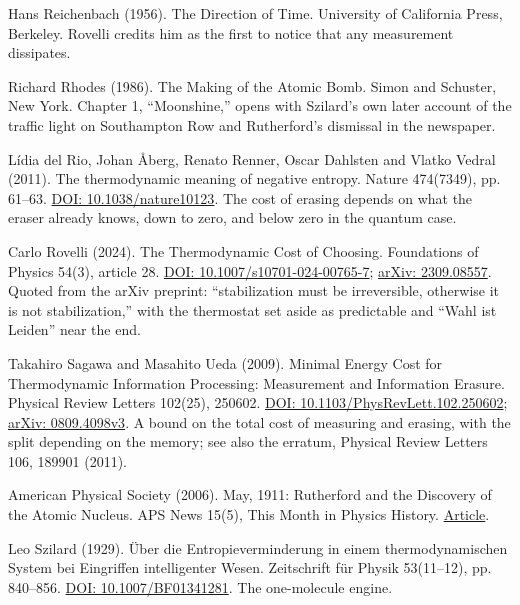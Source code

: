 \documentclass[11pt,twoside]{article}
\theoremstyle{thielethm}
\theoremstyle{thieledef}
\theoremstyle{thieledef}
\theoremstyle{thieledef}
\theoremstyle{thielethm}
\theoremstyle{thieleobs}
\theoremstyle{thielethm}
\begin{document}
\noindent Hans Reichenbach (1956). The Direction of Time. University of California Press, Berkeley. Rovelli credits him as the first to notice that any measurement dissipates.
\par\medskip

\noindent Richard Rhodes (1986). The Making of the Atomic Bomb. Simon and Schuster, New York. Chapter 1, ``Moonshine,'' opens with Szilard's own later account of the traffic light on Southampton Row and Rutherford's dismissal in the newspaper.
\par\medskip

\noindent L\'idia del Rio, Johan \AA{}berg, Renato Renner, Oscar Dahlsten and Vlatko Vedral (2011). The thermodynamic meaning of negative entropy. Nature 474(7349), pp. 61--63. \href{https://doi.org/10.1038/nature10123}{DOI: 10.1038/nature10123}. The cost of erasing depends on what the eraser already knows, down to zero, and below zero in the quantum case.
\par\medskip

\noindent Carlo Rovelli (2024). The Thermodynamic Cost of Choosing. Foundations of Physics 54(3), article 28. \href{https://doi.org/10.1007/s10701-024-00765-7}{DOI: 10.1007/s10701-024-00765-7}; \href{https://arxiv.org/abs/2309.08557}{arXiv: 2309.08557}. Quoted from the arXiv preprint: ``stabilization must be irreversible, otherwise it is not stabilization,'' with the thermostat set aside as predictable and ``Wahl ist Leiden'' near the end.
\par\medskip

\noindent Takahiro Sagawa and Masahito Ueda (2009). Minimal Energy Cost for Thermodynamic Information Processing: Measurement and Information Erasure. Physical Review Letters 102(25), 250602. \href{https://doi.org/10.1103/PhysRevLett.102.250602}{DOI: 10.1103/PhysRevLett.102.250602}; \href{https://arxiv.org/abs/0809.4098v3}{arXiv: 0809.4098v3}. A bound on the total cost of measuring and erasing, with the split depending on the memory; see also the erratum, Physical Review Letters 106, 189901 (2011).
\par\medskip

\noindent American Physical Society (2006). May, 1911: Rutherford and the Discovery of the Atomic Nucleus. APS News 15(5), This Month in Physics History. \href{https://www.aps.org/publications/apsnews/200605/history.cfm}{Article}.
\par\medskip

\noindent Leo Szilard (1929). \"Uber die Entropieverminderung in einem thermodynamischen System bei Eingriffen intelligenter Wesen. Zeitschrift f\"ur Physik 53(11--12), pp. 840--856. \href{https://doi.org/10.1007/BF01341281}{DOI: 10.1007/BF01341281}. The one-molecule engine.
\par\medskip
\end{document}
